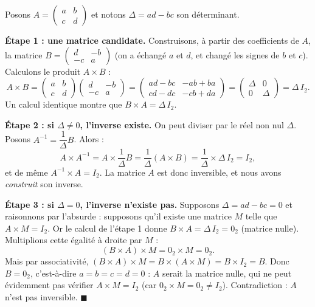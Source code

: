 \documentclass[11pt]{article}
\begin{document}
\begin{experience}
Posons $A = \begin{pmatrix} a & b \\ c & d \end{pmatrix}$ et notons $\Delta = ad - bc$ son déterminant.

\textbf{Étape 1 : une matrice candidate.} Construisons, à partir des coefficients de $A$, la matrice $B = \begin{pmatrix} d & -b \\ -c & a \end{pmatrix}$ (on a échangé $a$ et $d$, et changé les signes de $b$ et $c$). Calculons le produit $A \times B$ :
\[ A \times B = \begin{pmatrix} a & b \\ c & d \end{pmatrix} \begin{pmatrix} d & -b \\ -c & a \end{pmatrix} = \begin{pmatrix} ad - bc & -ab + ba \\ cd - dc & -cb + da \end{pmatrix} = \begin{pmatrix} \Delta & 0 \\ 0 & \Delta \end{pmatrix} = \Delta \, I_2. \]
Un calcul identique montre que $B \times A = \Delta \, I_2$.

\textbf{Étape 2 : si $\Delta \neq 0$, l'inverse existe.} On peut diviser par le réel non nul $\Delta$. Posons $A^{-1} = \dfrac{1}{\Delta} B$. Alors :
\[ A \times A^{-1} = A \times \frac{1}{\Delta} B = \frac{1}{\Delta}(A \times B) = \frac{1}{\Delta} \times \Delta\, I_2 = I_2, \]
et de même $A^{-1} \times A = I_2$. La matrice $A$ est donc inversible, et nous avons \emph{construit} son inverse.

\textbf{Étape 3 : si $\Delta = 0$, l'inverse n'existe pas.} Supposons $\Delta = ad - bc = 0$ et raisonnons par l'absurde : supposons qu'il existe une matrice $M$ telle que $A \times M = I_2$. Or le calcul de l'étape 1 donne $B \times A = \Delta\, I_2 = 0_2$ (matrice nulle). Multiplions cette égalité à droite par $M$ :
\[ (B \times A) \times M = 0_2 \times M = 0_2. \]
Mais par associativité, $(B \times A) \times M = B \times (A \times M) = B \times I_2 = B$. Donc $B = 0_2$, c'est-à-dire $a = b = c = d = 0$ : $A$ serait la matrice nulle, qui ne peut évidemment pas vérifier $A \times M = I_2$ (car $0_2 \times M = 0_2 \neq I_2$). Contradiction : $A$ n'est pas inversible. $\blacksquare$
\end{experience}
\end{document}
